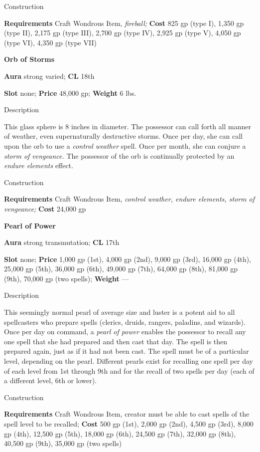 Construction
				
\textbf{Requirements} Craft Wondrous Item,\textit{ fireball;}\textbf{ Cost }825 gp (type I), 1,350 gp (type II), 2,175 gp (type III), 2,700 gp (type IV), 2,925 gp (type V), 4,050 gp (type VI), 4,350 gp (type VII)
				
\textbf{Orb of Storms}
				
\textbf{Aura} strong varied;\textbf{ CL }18th
				
\textbf{Slot} none; \textbf{Price} 48,000 gp; \textbf{Weight} 6 lbs.
				
Description
				
This glass sphere is 8 inches in diameter. The possessor can call forth all manner of weather, even supernaturally destructive storms. Once per day, she can call upon the orb to use a \textit{control weather} spell. Once per month, she can conjure a \textit{storm of vengeance. }The possessor of the orb is continually protected by an \textit{endure elements} effect. 
				
Construction
				
\textbf{Requirements} Craft Wondrous Item,\textit{ control weather, endure elements, storm of vengeance;}\textbf{ Cost }24,000 gp
				
\textbf{Pearl of Power}
				
\textbf{Aura} strong transmutation;\textbf{ CL }17th
				
\textbf{Slot} none; \textbf{Price} 1,000 gp (1st), 4,000 gp (2nd), 9,000 gp (3rd), 16,000 gp (4th), 25,000 gp (5th), 36,000 gp (6th), 49,000 gp (7th), 64,000 gp (8th), 81,000 gp (9th), 70,000 gp (two spells); \textbf{Weight }---
				
Description
				
This seemingly normal pearl of average size and luster is a potent aid to all spellcasters who prepare spells (clerics, druids, rangers, paladins, and wizards). Once per day on command, a \textit{pearl of power} enables the possessor to recall any one spell that she had prepared and then cast that day. The spell is then prepared again, just as if it had not been cast. The spell must be of a particular level, depending on the pearl. Different pearls exist for recalling one spell per day of each level from 1st through 9th and for the recall of two spells per day (each of a different level, 6th or lower). 
				
Construction
				
\textbf{Requirements} Craft Wondrous Item, creator must be able to cast spells of the spell level to be recalled;\textbf{ Cost }500 gp (1st), 2,000 gp (2nd), 4,500 gp (3rd), 8,000 gp (4th), 12,500 gp (5th), 18,000 gp (6th), 24,500 gp (7th), 32,000 gp (8th), 40,500 gp (9th), 35,000 gp (two spells)
				
